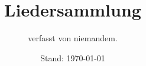 \documentclass{article}
\title{Liedersammlung}
\author{verfasst von niemandem.}
\date{Stand: \today}
\begin{document}
\begin{titlepage}
    \maketitle
\end{titlepage}
\end{document}
